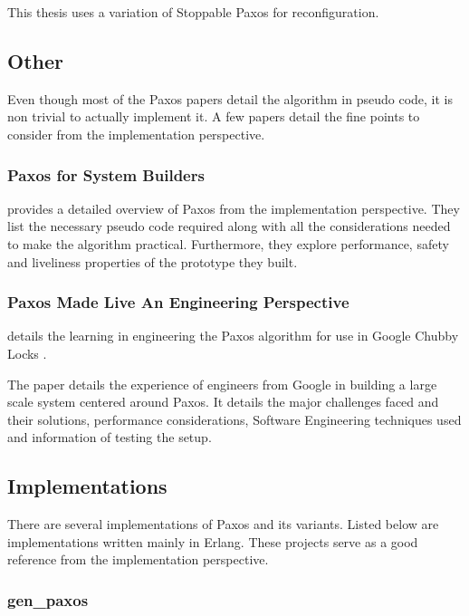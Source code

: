 This thesis uses a variation of Stoppable Paxos for reconfiguration.

\subsection{Other}

Even though most of the Paxos papers detail the algorithm in pseudo code, it is
non trivial to actually implement it. A few papers detail the fine points to
consider from the implementation perspective.

\subsubsection{Paxos for System Builders}

\citet{Kirsch08paxosfor} provides a detailed overview of Paxos from the
implementation perspective. They list the necessary pseudo code required
along with all the considerations needed to make the algorithm practical.
Furthermore, they explore performance, safety and liveliness
properties of the prototype they built.

\subsubsection{Paxos Made Live \dash{} An Engineering Perspective}

\cite{ChandraGR07}
details the learning in engineering the Paxos algorithm for use in
Google Chubby Locks \citep{Burrows06}.

The paper details the experience of engineers from Google in building a
large scale system centered around Paxos. It details the major challenges faced
and their solutions, performance considerations, Software Engineering techniques
used and information of testing the setup.

\subsection{Implementations}

There are several implementations of Paxos and its variants. Listed below are
implementations written mainly in Erlang. These projects serve as a good
reference from the implementation perspective.

\subsubsection{gen\_paxos}

